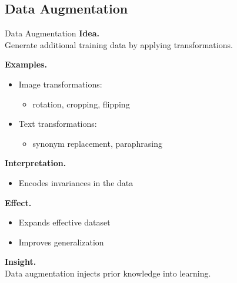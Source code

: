 \documentclass[aspectratio=169,11pt]{beamer}
\begin{document}
\subsection{Data Augmentation}
\begin{frame}[t,allowframebreaks]{Data Augmentation}
\small
\textbf{Idea.}\\ Generate additional training data by applying transformations.

\textbf{Examples.}\\ \begin{itemize}
    \item Image transformations:
    \begin{itemize}
        \item rotation, cropping, flipping
    \end{itemize}

    \item Text transformations:
    \begin{itemize}
        \item synonym replacement, paraphrasing
    \end{itemize}
\end{itemize}

\textbf{Interpretation.}\\ \begin{itemize}
    \item Encodes invariances in the data
\end{itemize}

\textbf{Effect.}\\ \begin{itemize}
    \item Expands effective dataset
    \item Improves generalization
\end{itemize}

\textbf{Insight.}\\ Data augmentation injects prior knowledge into learning.
\end{frame}
\end{document}
